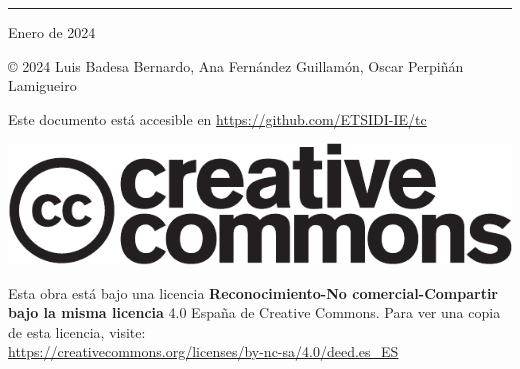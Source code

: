 
\chapterprecis{\vfill{}
}
\rule[.5ex]{\linewidth}{1pt} 

Enero de 2024

© 2024 Luis Badesa Bernardo, Ana Fernández Guillamón, Oscar Perpiñán Lamigueiro

Este documento está accesible en \url{https://github.com/ETSIDI-IE/tc}

\begin{center}
\includegraphics[scale=0.5]{../figs/cc-logo}
\par\end{center}

Esta obra está bajo una licencia \textbf{Reconocimiento-No comercial-Compartir
bajo la misma licencia} 4.0 España de Creative Commons. Para ver una
copia de esta licencia, visite:\\
 \url{https://creativecommons.org/licenses/by-nc-sa/4.0/deed.es_ES}

